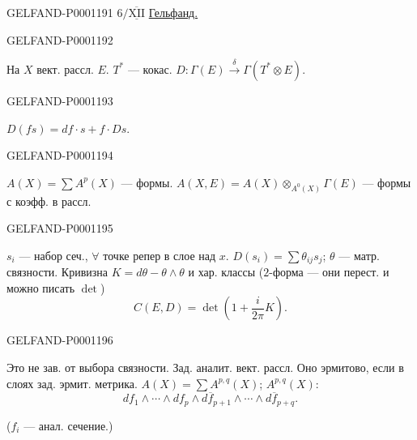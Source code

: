 \begin{GelfandAdjacentEvidence}{GELFAND-P000119}{1}
$6/\underline{\overline{\mathrm{XII}}}$ \underline{Гельфанд.}
\end{GelfandAdjacentEvidence}
\begin{GelfandAdjacentEvidence}{GELFAND-P000119}{2}

На $X$ вект. рассл. $E$. $T^*$ — кокас.
$D:\Gamma(E)\stackrel{\delta}{\longrightarrow}\Gamma(T^*\otimes E)$.
\end{GelfandAdjacentEvidence}
\begin{GelfandAdjacentEvidence}{GELFAND-P000119}{3}

$D(fs)=df\cdot s+f\cdot Ds$.
\end{GelfandAdjacentEvidence}
\begin{GelfandAdjacentEvidence}{GELFAND-P000119}{4}

$A(X)=\sum A^p(X)$ — формы.
$A(X,E)=A(X)\otimes_{A^0(X)}\Gamma(E)$ — формы с коэфф. в рассл.
\end{GelfandAdjacentEvidence}
\begin{GelfandAdjacentEvidence}{GELFAND-P000119}{5}

$s_i$ — набор сеч., $\forall$ точке репер в слое над $x$.
$D(s_i)=\sum\theta_{ij}s_j$; $\theta$ — матр. связности.
Кривизна $K=d\theta-\theta\wedge\theta$ и хар. классы
($2$-форма — они перест. и можно писать $\det$)
\begin{equation*}C(E,D)=\det\left(1+\frac{i}{2\pi}K\right).\end{equation*}
\end{GelfandAdjacentEvidence}
\begin{GelfandAdjacentEvidence}{GELFAND-P000119}{6}

Это не зав. от выбора связности.
\noindent{}
Зад. аналит. вект. рассл. Оно эрмитово, если в слоях зад. эрмит. метрика.
$A(X)=\sum A^{p,q}(X)$; $A^{p,q}(X)$:
\begin{equation*}
df_1\wedge\cdots\wedge df_p\wedge d\overline f_{p+1}
\wedge\cdots\wedge d\overline f_{p+q}.
\end{equation*}

($f_i$ — анал. сечение.)
\end{GelfandAdjacentEvidence}
